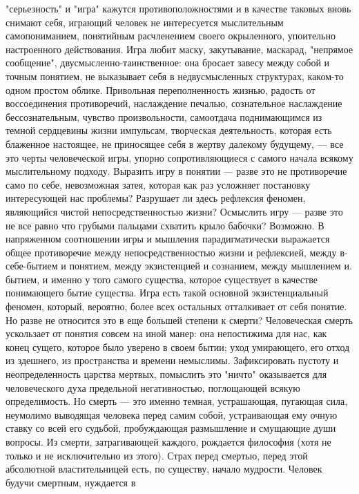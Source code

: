 \documentclass[12pt]{article}
\begin{document}
"серьезность" и "игра" кажутся
противоположностями  и  в  качестве  таковых  вновь  снимают  себя,  играющий  человек  не  интересуется
мыслительным самопониманием,  понятийным расчленением своего окрыленного,  упоительно настроенного
действования. Игра любит маску, закутывание, маскарад, "непрямое сообщение", двусмысленно-таинственное:
она бросает завесу между собой и точным понятием, не выказывает себя в недвусмысленных структурах, каком-то  одном простом  облике.  Привольная переполненность  жизнью,  радость от воссоединения противоречий,
наслаждение  печалью,  сознательное  наслаждение  бессознательным,  чувство  произвольности,  самоотдача
поднимающимся из темной сердцевины жизни импульсам, творческая деятельность, которая есть блаженное
настоящее, не приносящее себя в жертву далекому будущему, --- все это черты человеческой игры, упорно
сопротивляющиеся с самого начала всякому мыслительному подходу. Выразить игру в понятии --- разве это не
противоречие  само  по  себе,  невозможная  затея,  которая  как  раз  усложняет  постановку  интересующей  нас
проблемы?  Разрушает  ли  здесь  рефлексия  феномен,  являющийся  чистой  непосредственностью  жизни?
Осмыслить игру  --- разве это  не все равно что грубыми пальцами схватить крыло бабочки?  Возможно.  В
напряженном  соотношении  игры  и  мышления  парадигматически  выражается  общее  противоречие  между
непосредственностью жизни и рефлексией, между в-себе-бытием и понятием, между экзистенцией и сознанием,
между мышлением и. бытием, и именно у того самого существа, которое существует в качестве понимающего
бытие  существа.  Игра  есть  такой  основной  экзистенциальный  феномен,  который,  вероятно,  более  всех
остальных отталкивает от себя понятие.
Но разве не относится это в еще большей степени к смерти? Человеческая смерть ускользает от понятия совсем
на иной  манер: она непостижима для нас,  как  конец  сущего,  которое  было  уверено  в  своем  бытии; уход
умирающего,  его  отход  из  здешнего,  из  пространства  и  времени  немыслимы.  Зафиксировать  пустоту  и
неопределенность царства мертвых, помыслить это "ничто" оказывается для человеческого духа предельной
негативностью,  поглощающей  всякую  определимость.  Но  смерть  ---  это  именно  темная,  устрашающая,
пугающая сила, неумолимо выводящая человека перед самим собой, устраивающая ему очную ставку со всей
его судьбой, пробуждающая размышление и смущающие души вопросы. Из смерти, затрагивающей каждого,
рождается  философия  (хотя  не  только  и  не  исключительно  из  этого).  Страх  перед  смертью,  перед  этой
абсолютной  властительницей есть, по  существу, начало  мудрости.  Человек  будучи смертным,  нуждается в
\end{document}
